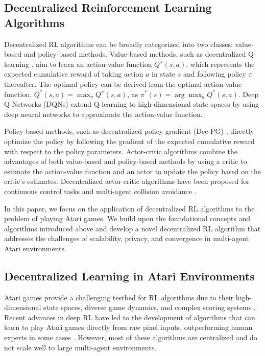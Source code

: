\subsection{Decentralized Reinforcement Learning Algorithms}

Decentralized RL algorithms can be broadly categorized into two classes: value-based and policy-based methods. Value-based methods, such as decentralized Q-learning \citep{hasselt2015deep}, aim to learn an action-value function $Q^\pi(s, a)$, which represents the expected cumulative reward of taking action $a$ in state $s$ and following policy $\pi$ thereafter. The optimal policy can be derived from the optimal action-value function, $Q^*(s, a) = \max_\pi Q^\pi(s, a)$, as $\pi^*(s) = \arg\max_a Q^*(s, a)$. Deep Q-Networks (DQNs) \citep{mnih2013playing} extend Q-learning to high-dimensional state spaces by using deep neural networks to approximate the action-value function.

Policy-based methods, such as decentralized policy gradient (Dec-PG) \citep{lu2021decentralized}, directly optimize the policy by following the gradient of the expected cumulative reward with respect to the policy parameters. Actor-critic algorithms \citep{lillicrap2015continuous} combine the advantages of both value-based and policy-based methods by using a critic to estimate the action-value function and an actor to update the policy based on the critic's estimates. Decentralized actor-critic algorithms have been proposed for continuous control tasks \citep{mnih2016asynchronous} and multi-agent collision avoidance \citep{thumiger2022a}.

In this paper, we focus on the application of decentralized RL algorithms to the problem of playing Atari games. We build upon the foundational concepts and algorithms introduced above and develop a novel decentralized RL algorithm that addresses the challenges of scalability, privacy, and convergence in multi-agent Atari environments.

\subsection{Decentralized Learning in Atari Environments}

Atari games provide a challenging testbed for RL algorithms due to their high-dimensional state spaces, diverse game dynamics, and complex scoring systems \citep{mnih2013playing}. Recent advances in deep RL have led to the development of algorithms that can learn to play Atari games directly from raw pixel inputs, outperforming human experts in some cases \citep{mnih2013playing}. However, most of these algorithms are centralized and do not scale well to large multi-agent environments.


